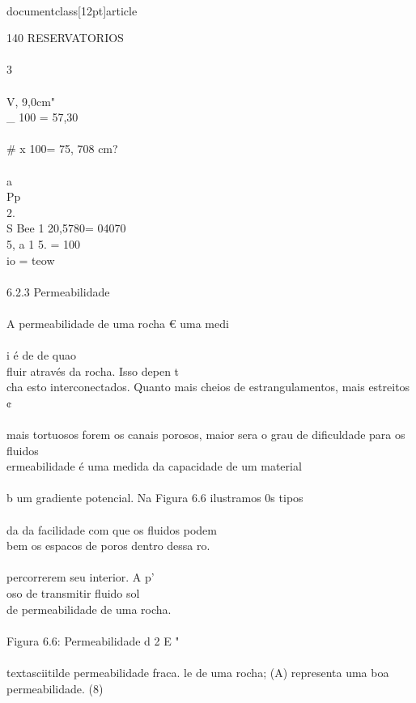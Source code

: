\\documentclass[12pt]{article}
\begin{document}
140 RESERVATORIOS\\
\\
3\\
\\
V, 9,0cm" \\_ 100 = 57,30\\%
\\# x 100= 75, 708 cm?\\
\\
a\\
Pp\\
2.\\
S Bee 1 20,5780= 04070\\
5, a 1 5. = 100\\%
io = teow\\
\\
6.2.3 Permeabilidade\\
\\
A permeabilidade de uma rocha € uma medi\\
\\
i é de de quao\\
fluir através da rocha. Isso depen t\\
cha esto interconectados. Quanto mais cheios de estrangulamentos, mais estreitos ¢\\
\\
mais tortuosos forem os canais porosos, maior sera o grau de dificuldade para os fluidos\\
ermeabilidade é uma medida da capacidade de um material\\
\\
b um gradiente potencial. Na Figura 6.6 ilustramos 0s tipos\\
\\
da da facilidade com que os fluidos podem\\
bem os espacos de poros dentro dessa ro.\\
\\
percorrerem seu interior. A p'\\
oso de transmitir fluido sol\\
de permeabilidade de uma rocha.\\
\\
Figura 6.6: Permeabilidade d 2 E "\\
\\textasciitilde{} permeabilidade fraca. le de uma rocha; (A) representa uma boa permeabilidade. (8)\\
\end{document}
